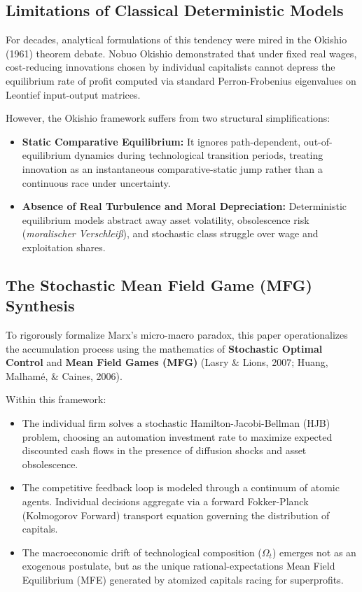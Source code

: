 \documentclass[11pt,letterpaper]{report}
\begin{document}
\subsection{Limitations of Classical Deterministic Models}
For decades, analytical formulations of this tendency were mired in the Okishio (1961) theorem debate. Nobuo Okishio demonstrated that under fixed real wages, cost-reducing innovations chosen by individual capitalists cannot depress the equilibrium rate of profit computed via standard Perron-Frobenius eigenvalues on Leontief input-output matrices.

However, the Okishio framework suffers from two structural simplifications:

\begin{itemize}
\item \textbf{Static Comparative Equilibrium:} It ignores path-dependent, out-of-equilibrium dynamics during technological transition periods, treating innovation as an instantaneous comparative-static jump rather than a continuous race under uncertainty.
\item \textbf{Absence of Real Turbulence and Moral Depreciation:} Deterministic equilibrium models abstract away asset volatility, obsolescence risk (\emph{moralischer Verschleiß}), and stochastic class struggle over wage and exploitation shares.
\end{itemize}
\subsection{The Stochastic Mean Field Game (MFG) Synthesis}
To rigorously formalize Marx's micro-macro paradox, this paper operationalizes the accumulation process using the mathematics of \textbf{Stochastic Optimal Control} and \textbf{Mean Field Games (MFG)} (Lasry \& Lions, 2007; Huang, Malhamé, \& Caines, 2006).

Within this framework:

\begin{itemize}
\item The individual firm solves a stochastic Hamilton-Jacobi-Bellman (HJB) problem, choosing an automation investment rate to maximize expected discounted cash flows in the presence of diffusion shocks and asset obsolescence.
\item The competitive feedback loop is modeled through a continuum of atomic agents. Individual decisions aggregate via a forward Fokker-Planck (Kolmogorov Forward) transport equation governing the distribution of capitals.
\item The macroeconomic drift of technological composition (${\Omega }_{t}$) emerges not as an exogenous postulate, but as the unique rational-expectations Mean Field Equilibrium (MFE) generated by atomized capitals racing for superprofits.
\end{itemize}
\end{document}
